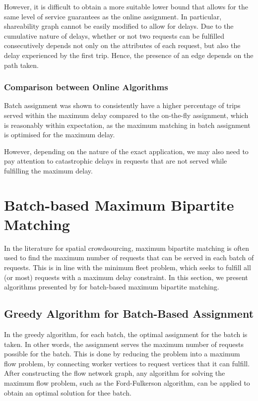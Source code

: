 \documentclass[urop]{socreport}
\begin{document}
However, it is difficult to obtain a more suitable lower bound that allows for the same level of service guarantees as the online assignment. In particular, shareability graph cannot be easily modified to allow for delays. Due to the cumulative nature of delays, whether or not two requests can be fulfilled consecutively depends not only on the attributes of each request, but also the delay experienced by the first trip. Hence, the presence of an edge depends on the path taken.

\subsubsection{Comparison between Online Algorithms}
Batch assignment was shown to consistently have a higher percentage of trips served within the maximum delay compared to the on-the-fly assignment, which is reasonably within expectation, as the maximum matching in batch assignment is optimised for the maximum delay.

However, depending on the nature of the exact application, we may also need to pay attention to catastrophic delays in requests that are not served while fulfilling the maximum delay.

\section{Batch-based Maximum Bipartite Matching}
In the literature for spatial crowdsourcing, maximum bipartite matching is often used to find the maximum number of requests that can be served in each batch of requests. This is in line with the minimum fleet problem, which seeks to fulfill all (or most) requests with a maximum delay constraint. In this section, we present algorithms presented by \cite{kazemi} for batch-based maximum bipartite matching.

\subsection{Greedy Algorithm for Batch-Based Assignment}
In the greedy algorithm, for each batch, the optimal assignment for the batch is taken. In other words, the assignment serves the maximum number of requests possible for the batch. This is done by reducing the problem into a maximum flow problem, by connecting worker vertices to request vertices that it can fulfill. After constructing the flow network graph, any algorithm for solving the maximum flow problem, such as the Ford-Fulkerson algorithm, can be applied to obtain an optimal solution for thee batch. 
\end{document}
